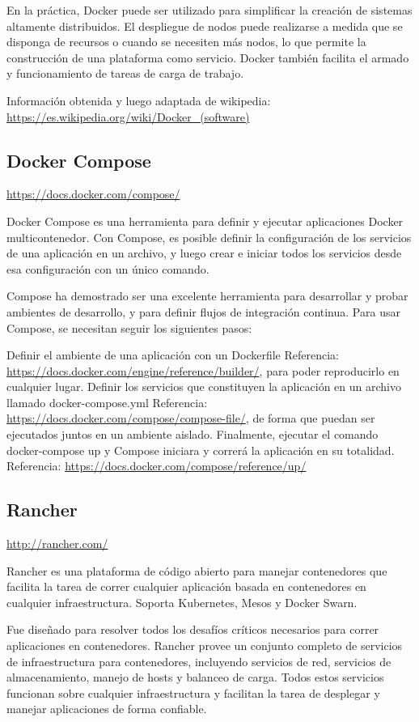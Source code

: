 En la práctica, Docker puede ser utilizado para simplificar la creación de
sistemas altamente distribuidos. El despliegue de nodos puede realizarse a
medida que se disponga de recursos o cuando se necesiten más nodos, lo que
permite la construcción de una plataforma como servicio. Docker también
facilita el armado y funcionamiento de tareas de carga de trabajo.

Información obtenida y luego adaptada de wikipedia:
\url{https://es.wikipedia.org/wiki/Docker_(software)}


\subsection{Docker Compose}
\url{https://docs.docker.com/compose/}

Docker Compose es una herramienta para definir y ejecutar aplicaciones Docker
multicontenedor. Con Compose, es posible definir la configuración de los
servicios de una aplicación en un archivo, y luego crear e iniciar todos los
servicios desde esa configuración con un único comando.

Compose ha demostrado ser una excelente herramienta para desarrollar y probar
ambientes de desarrollo, y para definir flujos de integración continua. Para
usar Compose, se necesitan seguir los siguientes pasos:

Definir el ambiente de una aplicación con un Dockerfile Referencia:
\url{https://docs.docker.com/engine/reference/builder/}, para poder
reproducirlo en cualquier lugar.  Definir los servicios que constituyen la
aplicación en un archivo llamado docker-compose.yml Referencia:
\url{https://docs.docker.com/compose/compose-file/}, de forma que puedan ser
ejecutados juntos en un ambiente aislado.  Finalmente, ejecutar el comando
docker-compose up y Compose iniciara y correrá la aplicación en su totalidad.
Referencia: \url{https://docs.docker.com/compose/reference/up/}


\subsection{Rancher}
\url{http://rancher.com/}

Rancher es una plataforma de código abierto para manejar contenedores que
facilita la tarea de correr cualquier aplicación basada en contenedores en
cualquier infraestructura. Soporta Kubernetes, Mesos y Docker Swarn.

Fue diseñado para resolver todos los desafíos críticos necesarios para correr
aplicaciones en contenedores. Rancher provee un conjunto completo de servicios
de infraestructura para contenedores, incluyendo servicios de red, servicios de
almacenamiento, manejo de hosts y balanceo de carga. Todos estos servicios
funcionan sobre cualquier infraestructura y facilitan la tarea de desplegar y
manejar aplicaciones de forma confiable.

